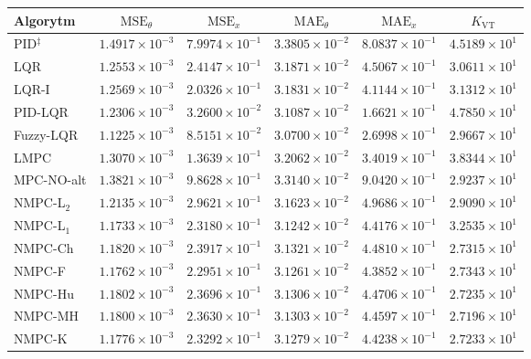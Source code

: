 \begin{tabular}{lccccc}
\hline
Algorytm & $\mathrm{MSE}_\theta$ & $\mathrm{MSE}_{x}$ & $\mathrm{MAE}_\theta$ & $\mathrm{MAE}_{x}$ & $K_\mathrm{VT}$ \\
\hline
PID$^{\ddagger}$ & $1.4917\times10^{-3}$ & $7.9974\times10^{-1}$ & $3.3805\times10^{-2}$ & $8.0837\times10^{-1}$ & $4.5189\times10^{1}$ \\
LQR & $1.2553\times10^{-3}$ & $2.4147\times10^{-1}$ & $3.1871\times10^{-2}$ & $4.5067\times10^{-1}$ & $3.0611\times10^{1}$ \\
LQR-I & $1.2569\times10^{-3}$ & $2.0326\times10^{-1}$ & $3.1831\times10^{-2}$ & $4.1144\times10^{-1}$ & $3.1312\times10^{1}$ \\
PID-LQR & $1.2306\times10^{-3}$ & {\boldmath$3.2600\times10^{-2}$} & $3.1087\times10^{-2}$ & {\boldmath$1.6621\times10^{-1}$} & $4.7850\times10^{1}$ \\
Fuzzy-LQR & {\boldmath$1.1225\times10^{-3}$} & $8.5151\times10^{-2}$ & {\boldmath$3.0700\times10^{-2}$} & $2.6998\times10^{-1}$ & $2.9667\times10^{1}$ \\
LMPC & $1.3070\times10^{-3}$ & $1.3639\times10^{-1}$ & $3.2062\times10^{-2}$ & $3.4019\times10^{-1}$ & $3.8344\times10^{1}$ \\
MPC-NO-alt & $1.3821\times10^{-3}$ & $9.8628\times10^{-1}$ & $3.3140\times10^{-2}$ & $9.0420\times10^{-1}$ & $2.9237\times10^{1}$ \\
\hline
NMPC-L$_2$ & $1.2135\times10^{-3}$ & $2.9621\times10^{-1}$ & $3.1623\times10^{-2}$ & $4.9686\times10^{-1}$ & $2.9090\times10^{1}$ \\
NMPC-L$_1$ & $1.1733\times10^{-3}$ & $2.3180\times10^{-1}$ & $3.1242\times10^{-2}$ & $4.4176\times10^{-1}$ & $3.2535\times10^{1}$ \\
NMPC-Ch & $1.1820\times10^{-3}$ & $2.3917\times10^{-1}$ & $3.1321\times10^{-2}$ & $4.4810\times10^{-1}$ & $2.7315\times10^{1}$ \\
NMPC-F & $1.1762\times10^{-3}$ & $2.2951\times10^{-1}$ & $3.1261\times10^{-2}$ & $4.3852\times10^{-1}$ & $2.7343\times10^{1}$ \\
NMPC-Hu & $1.1802\times10^{-3}$ & $2.3696\times10^{-1}$ & $3.1306\times10^{-2}$ & $4.4706\times10^{-1}$ & $2.7235\times10^{1}$ \\
NMPC-MH & $1.1800\times10^{-3}$ & $2.3630\times10^{-1}$ & $3.1303\times10^{-2}$ & $4.4597\times10^{-1}$ & {\boldmath$2.7196\times10^{1}$} \\
NMPC-K & $1.1776\times10^{-3}$ & $2.3292\times10^{-1}$ & $3.1279\times10^{-2}$ & $4.4238\times10^{-1}$ & $2.7233\times10^{1}$ \\

\end{tabular}
